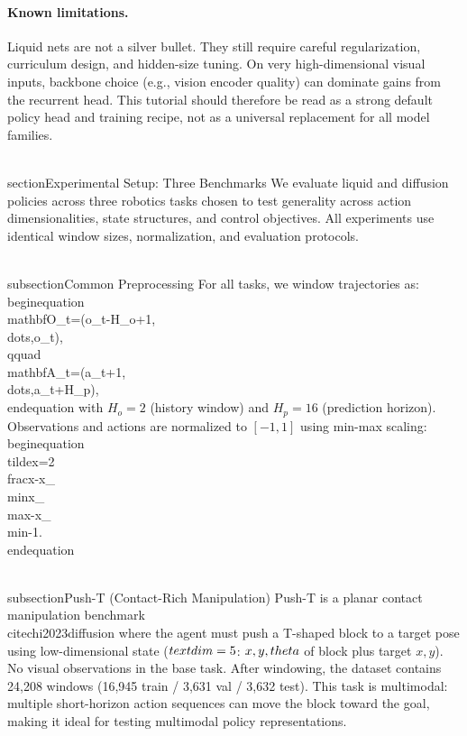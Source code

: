 \documentclass{article}
\begin{document}
\paragraph{Known limitations.}
Liquid nets are not a silver bullet. They still require careful regularization, curriculum design, and hidden-size tuning. On very high-dimensional visual inputs, backbone choice (e.g., vision encoder quality) can dominate gains from the recurrent head. This tutorial should therefore be read as a strong default policy head and training recipe, not as a universal replacement for all model families.

\\section{Experimental Setup: Three Benchmarks}
We evaluate liquid and diffusion policies across three robotics tasks chosen to test generality across action dimensionalities, state structures, and control objectives. All experiments use identical window sizes, normalization, and evaluation protocols.

\\subsection{Common Preprocessing}
For all tasks, we window trajectories as:
\\begin{equation}
\\mathbf{O}_{t}=(o_{t-H_o+1},\\dots,o_t),\\qquad
\\mathbf{A}_{t}=(a_{t+1},\\dots,a_{t+H_p}),
\\end{equation}
with $H_o=2$ (history window) and $H_p=16$ (prediction horizon). Observations and actions are normalized to $[-1,1]$ using min-max scaling:
\\begin{equation}
\\tilde{x}=2\\frac{x-x_{\\min}}{x_{\\max}-x_{\\min}}-1.
\\end{equation}

\\subsection{Push-T (Contact-Rich Manipulation)}
Push-T is a planar contact manipulation benchmark~\\cite{chi2023diffusion} where the agent must push a T-shaped block to a target pose using low-dimensional state ($\\text{dim}=5$: $x, y, \\theta$ of block plus target $x, y$). No visual observations in the base task. After windowing, the dataset contains 24,208 windows (16,945 train / 3,631 val / 3,632 test). This task is multimodal: multiple short-horizon action sequences can move the block toward the goal, making it ideal for testing multimodal policy representations.
\end{document}
